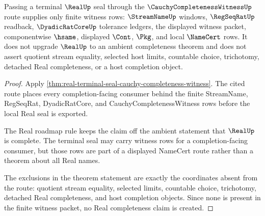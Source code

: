 \begin{theorem}
\label{thm:real-terminal-seal-no-completeness}
Passing a terminal $\RealUp$ seal through the
$\CauchyCompletenessWitnessUp$ route supplies only finite witness rows:
$\StreamNameUp$ windows, $\RegSeqRatUp$ readback, $\DyadicRatCoreUp$
tolerance ledgers, the displayed witness packet, componentwise $\hsame$,
displayed $\Cont$, $\Pkg$, and local $\NameCert$ rows. It does not upgrade
$\RealUp$ to an ambient completeness theorem and does not assert quotient
stream equality, selected host limits, countable choice, trichotomy, detached
Real completeness, or a host completion object.
\end{theorem}
\begin{proof}
Apply
\autoref{thm:real-terminal-seal-cauchy-completeness-witness}. The cited route
places every completion-facing consumer behind the finite StreamName,
RegSeqRat, DyadicRatCore, and CauchyCompletenessWitness rows before the local
Real seal is exported.

The Real roadmap rule keeps the claim off the ambient statement that
$\RealUp$ is complete. The terminal seal may carry witness rows for a
completion-facing consumer, but those rows are part of a displayed NameCert
route rather than a theorem about all Real names.

The exclusions in the theorem statement are exactly the coordinates absent
from the route: quotient stream equality, selected limits, countable choice,
trichotomy, detached Real completeness, and host completion objects. Since
none is present in the finite witness packet, no Real completeness claim is
created.
\end{proof}

